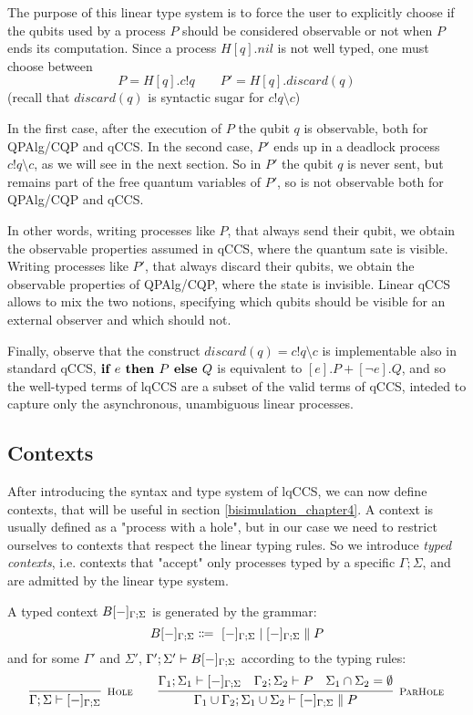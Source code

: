 The purpose of this linear type system is to force the user to explicitly choose if the qubits used by a process $P$ should be considered  observable or not when $P$ ends its computation. Since a process $H[q].nil$ is not well typed, one must choose between
\[ P = H[q].c!q \qquad P' = H[q].discard(q)
\]
(recall that $discard(q)$ is syntactic sugar for $c!q\setminus c$)

In the first case, after the execution of $P$ the qubit $q$ is observable, both for QPAlg/CQP and qCCS. In the second case, $P'$ ends up in a deadlock process $c!q \setminus c$, as we will see in the next section. So in $P'$ the qubit $q$ is never sent, but remains part of the free quantum variables of $P'$, so is not observable both for QPAlg/CQP and qCCS. 

In other words, writing processes like $P$, that always send their qubit, we obtain the observable properties assumed in qCCS, where the quantum sate is visible. Writing processes like $P'$, that always discard their qubits, we obtain the observable properties of QPAlg/CQP, where the state is invisible. Linear qCCS allows to mix the two notions, specifying which qubits should be visible for an external observer and which should not.

Finally, observe that the construct $discard(q) = c!q \setminus c$ is implementable also in standard qCCS, $\textbf{if } e \textbf{ then } P \textbf{ else } Q$ is equivalent to $[e].P + [\neg e].Q$, and so the well-typed terms of lqCCS are a subset of the valid terms of qCCS, inteded to capture only the asynchronous, unambiguous linear processes.

\subsection{Contexts}
After introducing the syntax and type system of lqCCS, we can now define contexts, that will be useful in section \ref{bisimulation_chapter4}. A context is usually defined as a "process with a hole", but in our case we need to restrict ourselves to contexts that respect the linear typing rules. So we introduce \textit{typed contexts}, i.e. contexts that "accept" only processes typed by a specific $\Gamma;\Sigma$, and are admitted by the linear type system.

\begin{definition}
A typed context $B[{-}]_{\Gamma; \Sigma}$ is generated by the grammar:
\[
B[\blank]_{\Gamma; \Sigma} \Coloneqq \ [\blank]_{\Gamma; \Sigma} \mid [\blank]_{\Gamma; \Sigma} \parallel P
\]
and for some $\Gamma'$ and $\Sigma'$, $\Gamma';\Sigma' \vdash B[{-}]_{\Gamma; \Sigma}$ according to the typing rules:
\[
  \infer[\mbox{\footnotesize\scshape Hole}]{\Gamma; \Sigma \vdash [\blank]_{\Gamma; \Sigma}}{}
\qquad
\infer[\mbox{\footnotesize\scshape ParHole}]{\Gamma_1 \cup \Gamma_2; \Sigma_1 \cup \Sigma_2 \vdash [\blank]_{\Gamma; \Sigma} \parallel P}
{\Gamma_1; \Sigma_1 \vdash [\blank]_{\Gamma; \Sigma} & \Gamma_2; \Sigma_2 \vdash P & \Sigma_1 \cap \Sigma_2 = \emptyset}
\]
\end{definition}

